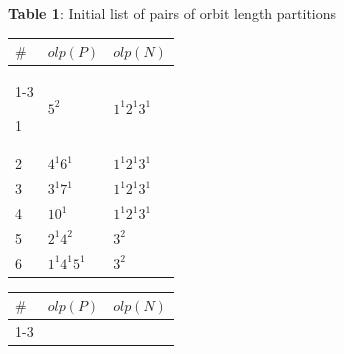 {\large{\bf Table 1}: \normalsize{
Initial list of pairs of orbit length partitions} 


\begin{center}

\begin{tabular}{||l|l|l||}      \hline
  $ \# $ & $olp(P)$               & $olp(N)$           \\ \cline{1-3}

     1   & $5^{2}$                & $1^{1}2^{1}3^{1}$   \\ \hline 
     2   & $4^{1}6^{1}$           & $1^{1}2^{1}3^{1}$   \\ \hline 
     3   & $3^{1}7^{1}$           & $1^{1}2^{1}3^{1}$   \\ \hline 
     4   & $10^{1}$               & $1^{1}2^{1}3^{1}$   \\ \hline 
     5   & $2^{1}4^{2}$           & $3^{2}$             \\ \hline 
     6   & $1^{1}4^{1}5^{1}$      & $3^{2}$             \\ \hline 
     
     
\end{tabular}

\end{center}
     
\begin{center}

\begin{tabular}{||l|l|l||}      \hline
  $ \# $ & $olp(P)$               & $olp(N)$           \\ \cline{1-3}



\end{tabular}
\end{center}}
